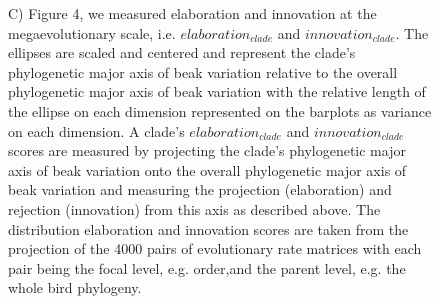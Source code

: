 \documentclass[12pt,letterpaper]{article}
\providecommand{\DIFaddtex}[1]{{\protect\color{blue}\uwave{#1}}} %
\providecommand{\DIFadd}[1]{\texorpdfstring{\DIFaddtex{#1}}{#1}} %
\begin{document}
\begin{figure}[!htbp]
{{C) Figure 4, we measured elaboration and innovation at the megaevolutionary scale, i.e. $elaboration_{clade}$ and $innovation_{clade}$.
The ellipses are scaled and centered and represent the clade's phylogenetic major axis of beak variation relative to the overall phylogenetic major axis of beak variation with the relative length of the ellipse on each dimension represented on the barplots as variance on each dimension.
A clade's $elaboration_{clade}$ and $innovation_{clade}$ scores are measured by projecting the clade's phylogenetic major axis of beak variation onto the overall phylogenetic major axis of beak variation and measuring the projection (elaboration) and rejection (innovation) from this axis as described above.
The distribution elaboration and innovation scores are taken from the projection of the 4000 pairs of evolutionary rate matrices with each pair being the focal level, e.g. order,and the parent level, e.g. the whole bird phylogeny.}}
\label{Fig:cheatsheet}
\end{figure}
\bigskip



\section{\DIFadd{Results and Discussion}}
\end{document}
